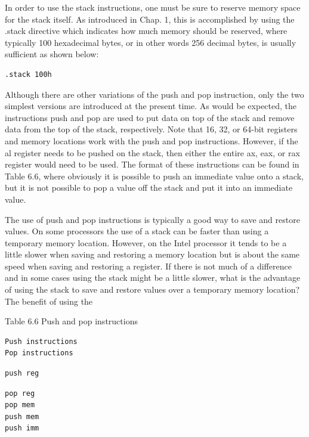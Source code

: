 \documentclass[10pt]{book}
\begin{document}
In order to use the stack instructions, one must be sure to reserve memory space for the stack itself. As introduced in Chap. 1, this is accomplished by using the .stack directive which indicates how much memory should be reserved, where typically 100 hexadecimal bytes, or in other words 256 decimal bytes, is usually sufficient as shown below:

\begin{verbatim}
.stack 100h
\end{verbatim}

Although there are other variations of the push and pop instruction, only the two simplest versions are introduced at the present time. As would be expected, the instructions push and pop are used to put data on top of the stack and remove data from the top of the stack, respectively. Note that 16, 32, or 64-bit registers and memory locations work with the push and pop instructions. However, if the al register needs to be pushed on the stack, then either the entire ax, eax, or rax register would need to be used. The format of these instructions can be found in Table 6.6, where obviously it is possible to push an immediate value onto a stack, but it is not possible to pop a value off the stack and put it into an immediate value.

The use of push and pop instructions is typically a good way to save and restore values. On some processors the use of a stack can be faster than using a temporary memory location. However, on the Intel processor it tends to be a little slower when saving and restoring a memory location but is about the same speed when saving and restoring a register. If there is not much of a difference and in some cases using the stack might be a little slower, what is the advantage of using the stack to save and restore values over a temporary memory location? The benefit of using the

Table 6.6 Push and pop instructions

\begin{verbatim}
Push instructions
Pop instructions
\end{verbatim}

\begin{verbatim}
push reg
\end{verbatim}

\begin{verbatim}
pop reg
pop mem
push mem
push imm
\end{verbatim}
\end{document}
